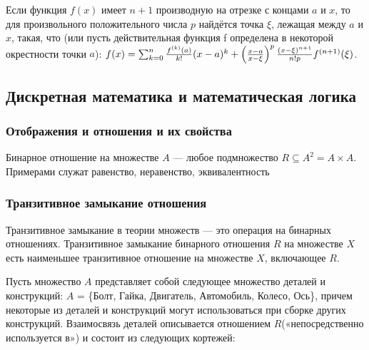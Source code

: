 \documentclass[12pt]{matmex-diploma}
\begin{document}
            Если функция $f(x)$ имеет $n+1$ производную на отрезке с концами $a$ и $x$, то для произвольного положительного числа $p$ найдётся точка $\xi$, лежащая между $a$ и $x$, такая, что (или пусть действительная функция f определена в некоторой окрестности точки $a$): 
            $f(x) = \sum_{k=0}^n {{f^{(k)}(a)} \over k!}(x-a)^k + {\left({x-a} \over {x - \xi}\right)^p {(x- \xi)^{n+1} \over n!p}f^{(n+1)}(\xi)}$.
        
    \subsection{Дискретная математика и математическая логика}
    
        \subsubsection*{Отображения и отношения и их свойства}
             Бинарное отношение на множестве $A$ — любое подмножество $R\subseteq A^{2}=A\times A$. Примерами служат равенство, неравенство, эквивалентность
            
        \subsubsection*{Транзитивное замыкание отношения}
            Транзитивное замыкание в теории множеств — это операция на бинарных отношениях. Транзитивное замыкание бинарного отношения $R$ на множестве $X$ есть наименьшее транзитивное отношение на множестве $X$, включающее $R$.
            
            Пусть множество $A$ представляет собой следующее множество деталей и конструкций: $A$ = \{Болт, Гайка, Двигатель, Автомобиль, Колесо, Ось\}, причем некоторые из деталей и конструкций могут использоваться при сборке других конструкций. Взаимосвязь деталей описывается отношением $R$(«непосредственно используется в») и состоит из следующих кортежей:
\end{document}
